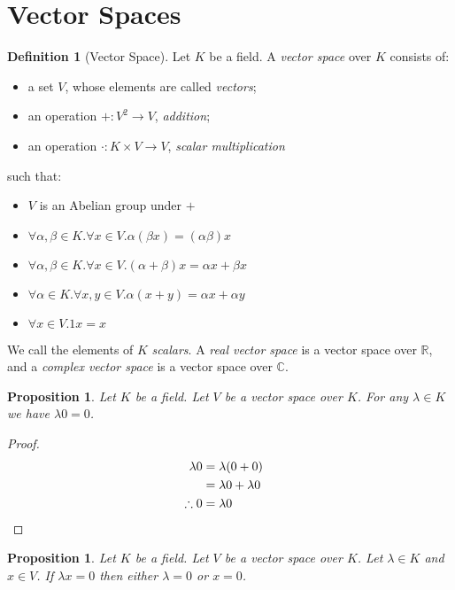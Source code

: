 \documentclass{book}
\let\qed\relax
\newtheorem{prop}[ax]{Proposition}
\theoremstyle{definition}
\newtheorem{df}[ax]{Definition}
\begin{document}
\section{Vector Spaces}

\begin{df}[Vector Space]
Let $K$ be a field. A \emph{vector space} over $K$ consists of:
\begin{itemize}
\item a set $V$, whose elements are called \emph{vectors};
\item an operation $+ : V^2 \rightarrow V$, \emph{addition};
\item an operation $\cdot : K \times V \rightarrow V$, \emph{scalar multiplication}
\end{itemize}
such that:
\begin{itemize}
\item $V$ is an Abelian group under $+$
\item $\forall \alpha, \beta \in K. \forall x \in V. \alpha (\beta x) = (\alpha \beta) x$
\item $\forall \alpha, \beta \in K. \forall x \in V. (\alpha + \beta) x = \alpha x + \beta x$
\item $\forall \alpha \in K. \forall x,y \in V. \alpha (x + y) = \alpha x + \alpha y$
\item $\forall x \in V. 1x = x$
\end{itemize}

We call the elements of $K$ \emph{scalars}. A \emph{real vector space} is a vector space over $\mathbb{R}$, and a \emph{complex vector space} is a vector space over $\mathbb{C}$.
\end{df}

\begin{prop}
Let $K$ be a field. Let $V$ be a vector space over $K$. For any $\lambda \in K$ we have $\lambda 0 = 0$.
\end{prop}

\begin{proof}
\pf\
\begin{align*}
\lambda 0 & = \lambda (0 + 0) \\
& = \lambda 0 + \lambda 0 \\
\therefore 0 & = \lambda 0 & \qed
\end{align*}
\end{proof}

\begin{prop}
Let $K$ be a field. Let $V$ be a vector space over $K$. Let $\lambda \in K$ and $x \in V$. If $\lambda x = 0$ then either $\lambda = 0$ or $x = 0$.
\end{prop}
\end{document}
